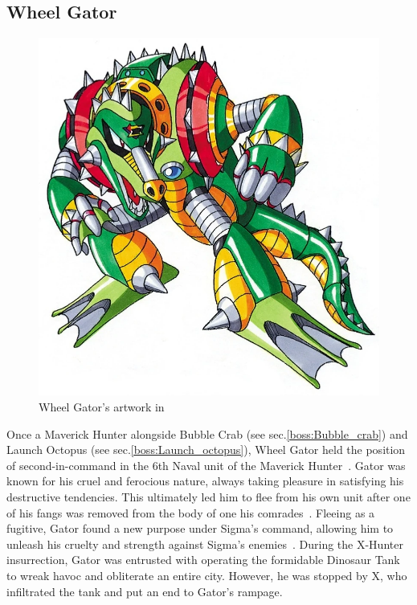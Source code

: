 \subsection{Wheel Gator}\label{boss:Wheel_gator}
\begin{figure}[htp]
	\centering
	\includegraphics[height=\portraitsize]{figures/X2/Wheel_gator/Wheel_Gator.png}
	\caption{Wheel Gator's artwork in \cite{book:MMX_Complete_art}}
\end{figure}

Once a Maverick Hunter alongside Bubble Crab (see sec.\ref{boss:Bubble_crab}) and Launch Octopus (see sec.\ref{boss:Launch_octopus}), Wheel Gator held the position of second-in-command in the 6th Naval unit of the Maverick Hunter~\cite{Xcoll1:Manual_X2}. Gator was known for his cruel and ferocious nature, always taking pleasure in satisfying his destructive tendencies. This ultimately led him to flee from his own unit after one of his fangs was removed from the body of one his comrades~\cite{wayback:X2_resources}. Fleeing as a fugitive, Gator found a new purpose under Sigma's command, allowing him to unleash his cruelty and strength against Sigma's enemies~\cite{wiki:Wheel_gator}. During the X-Hunter insurrection, Gator was entrusted with operating the formidable Dinosaur Tank to wreak havoc and obliterate an entire city. However, he was stopped by X, who infiltrated the tank and put an end to Gator's rampage.

